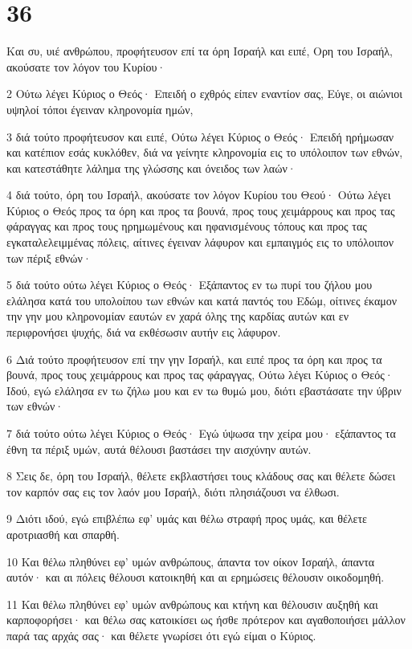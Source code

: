 \chapter{36}

\par Και συ, υιέ ανθρώπου, προφήτευσον επί τα όρη Ισραήλ και ειπέ, Ορη του Ισραήλ, ακούσατε τον λόγον του Κυρίου·
\par 2 Ούτω λέγει Κύριος ο Θεός· Επειδή ο εχθρός είπεν εναντίον σας, Εύγε, οι αιώνιοι υψηλοί τόποι έγειναν κληρονομία ημών,
\par 3 διά τούτο προφήτευσον και ειπέ, Ούτω λέγει Κύριος ο Θεός· Επειδή ηρήμωσαν και κατέπιον εσάς κυκλόθεν, διά να γείνητε κληρονομία εις το υπόλοιπον των εθνών, και κατεστάθητε λάλημα της γλώσσης και όνειδος των λαών·
\par 4 διά τούτο, όρη του Ισραήλ, ακούσατε τον λόγον Κυρίου του Θεού· Ούτω λέγει Κύριος ο Θεός προς τα όρη και προς τα βουνά, προς τους χειμάρρους και προς τας φάραγγας και προς τους ηρημωμένους και ηφανισμένους τόπους και προς τας εγκαταλελειμμένας πόλεις, αίτινες έγειναν λάφυρον και εμπαιγμός εις το υπόλοιπον των πέριξ εθνών·
\par 5 διά τούτο ούτω λέγει Κύριος ο Θεός· Εξάπαντος εν τω πυρί του ζήλου μου ελάλησα κατά του υπολοίπου των εθνών και κατά παντός του Εδώμ, οίτινες έκαμον την γην μου κληρονομίαν εαυτών εν χαρά όλης της καρδίας αυτών και εν περιφρονήσει ψυχής, διά να εκθέσωσιν αυτήν εις λάφυρον.
\par 6 Διά τούτο προφήτευσον επί την γην Ισραήλ, και ειπέ προς τα όρη και προς τα βουνά, προς τους χειμάρρους και προς τας φάραγγας, Ούτω λέγει Κύριος ο Θεός· Ιδού, εγώ ελάλησα εν τω ζήλω μου και εν τω θυμώ μου, διότι εβαστάσατε την ύβριν των εθνών·
\par 7 διά τούτο ούτω λέγει Κύριος ο Θεός· Εγώ ύψωσα την χείρα μου· εξάπαντος τα έθνη τα πέριξ υμών, αυτά θέλουσι βαστάσει την αισχύνην αυτών.
\par 8 Σεις δε, όρη του Ισραήλ, θέλετε εκβλαστήσει τους κλάδους σας και θέλετε δώσει τον καρπόν σας εις τον λαόν μου Ισραήλ, διότι πλησιάζουσι να έλθωσι.
\par 9 Διότι ιδού, εγώ επιβλέπω εφ' υμάς και θέλω στραφή προς υμάς, και θέλετε αροτριασθή και σπαρθή.
\par 10 Και θέλω πληθύνει εφ' υμών ανθρώπους, άπαντα τον οίκον Ισραήλ, άπαντα αυτόν· και αι πόλεις θέλουσι κατοικηθή και αι ερημώσεις θέλουσιν οικοδομηθή.
\par 11 Και θέλω πληθύνει εφ' υμών ανθρώπους και κτήνη και θέλουσιν αυξηθή και καρποφορήσει· και θέλω σας κατοικίσει ως ήσθε πρότερον και αγαθοποιήσει μάλλον παρά τας αρχάς σας· και θέλετε γνωρίσει ότι εγώ είμαι ο Κύριος.
